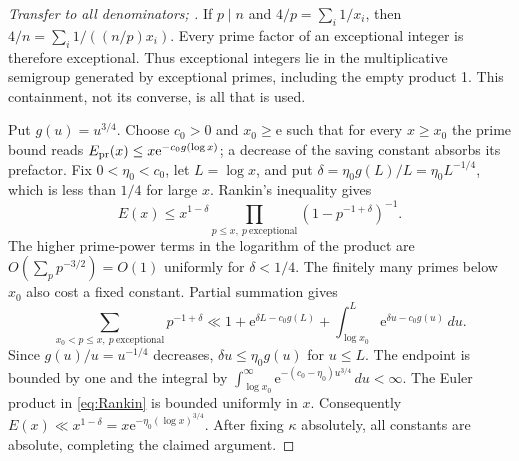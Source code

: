 \documentclass[10pt,reqno]{amsart}
\theoremstyle{remark}
\newcommand{\e}{\mathrm e}
\begin{document}
\begin{proof}[Transfer to all denominators; {\cite[Section 6]{LL}}]
If $p\mid n$ and $4/p=\sum_i1/x_i$, then
$4/n=\sum_i1/((n/p)x_i)$.  Every prime factor of an exceptional integer
is therefore exceptional.  Thus exceptional integers lie in the
multiplicative semigroup generated by exceptional primes, including the
empty product 1.  This containment, not its converse, is all that is used.

Put $g(u)=u^{3/4}$.  Choose $c_0>0$ and $x_0\geq\e$ such that for every
$x\geq x_0$ the prime bound reads
$E_{\rm pr}(x)\leq x\e^{-c_0g(\log x)}$; a decrease of the saving
constant absorbs its prefactor.  Fix $0<\eta_0<c_0$, let $L=\log x$,
and put $\delta=\eta_0g(L)/L=\eta_0L^{-1/4}$, which is less than
$1/4$ for large $x$.  Rankin's inequality gives
\begin{equation}\label{eq:Rankin}
 E(x)\leq x^{1-\delta}
       \prod_{p\leq x,\ p\ \mathrm{exceptional}}(1-p^{-1+\delta})^{-1}.
\end{equation}
The higher prime-power terms in the logarithm of the product are
$O(\sum_p p^{-3/2})=O(1)$ uniformly for $\delta<1/4$.
The finitely many primes below $x_0$ also cost a fixed constant.
Partial summation gives
\[
 \sum_{x_0<p\leq x,\ p\ \mathrm{exceptional}}p^{-1+\delta}
 \ll1+\e^{\delta L-c_0g(L)}+
             \int_{\log x_0}^{L}\e^{\delta u-c_0g(u)}\,du.
\]
Since $g(u)/u=u^{-1/4}$ decreases, $\delta u\leq\eta_0g(u)$ for
$u\leq L$.  The endpoint is bounded by one and the integral by
$\int_{\log x_0}^{\infty}\e^{-(c_0-\eta_0)u^{3/4}}\,du<\infty$.
The Euler product in \eqref{eq:Rankin} is bounded uniformly in $x$.
Consequently $E(x)\ll x^{1-\delta}=x\e^{-\eta_0(\log x)^{3/4}}$.
After fixing $\kappa$ absolutely, all constants are absolute, completing
the claimed argument.
\end{proof}
\end{document}
